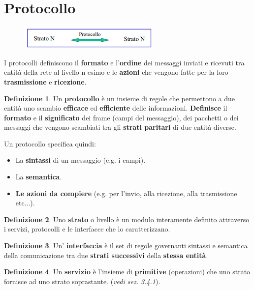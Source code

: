 \documentclass[11pt,a4paper,oneside]{book}
\theoremstyle{definition}
\newtheorem{definition}{Definizione}[section]
\begin{document}
\section{Protocollo}
\begin{figure}[!h]
	\includegraphics[scale=0.7]{Immagini/Protocollo.png}
	\centering
\end{figure}
I protocolli definiscono il \textbf{formato} e l’\textbf{ordine} dei
messaggi inviati e ricevuti tra entità della rete al livello n-esimo e
le \textbf{azioni} che vengono fatte per la loro \textbf{trasmissione} e
\textbf{ricezione}.
\theoremstyle{definition}
\begin{definition}
	Un \textbf{protocollo} è un insieme di regole che permettono a due entità uno scambio \textbf{efficace} ed \textbf{efficiente} delle informazioni. \textbf{Definisce} il \textbf{formato} e il
	\textbf{significato} dei frame (campi del messaggio), dei pacchetti o dei messaggi
	che vengono scambiati tra gli \textbf{strati paritari} di due
	entità diverse.
\end{definition}
Un protocollo specifica quindi:
\begin{itemize}
	\item La \textbf{sintassi} di un messaggio (e.g. i campi).
	\item La \textbf{semantica}.
	\item  \textbf{Le azioni da compiere }(e.g. per l'invio, alla ricezione, alla trasmissione etc...).
\end{itemize}
\theoremstyle{definition}
\begin{definition}
	Uno \textbf{strato} o livello è un modulo interamente definito attraverso i
	servizi, protocolli e le interfacce che lo caratterizzano.
\end{definition}
\theoremstyle{definition}
\begin{definition}
	Un' \textbf{interfaccia} è il set di regole governanti sintassi e semantica della comunicazione tra due \textbf{strati successivi} della \textbf{stessa entità}.
\end{definition}
\theoremstyle{definition}
\begin{definition}
	Un \textbf{servizio} è l'insieme di \textbf{primitive} (operazioni) che uno strato
	fornisce ad uno strato soprastante. (\textit{vedi sez. 3.4.1}).
\end{definition}
\end{document}
